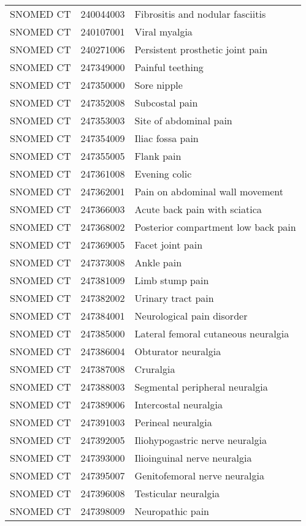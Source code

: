 \begin{longtable}{p{}p{}p{}}
  SNOMED CT & 240044003 & Fibrositis and nodular fasciitis \\ 
  SNOMED CT & 240107001 & Viral myalgia \\ 
  SNOMED CT & 240271006 & Persistent prosthetic joint pain \\ 
  SNOMED CT & 247349000 & Painful teething \\ 
  SNOMED CT & 247350000 & Sore nipple \\ 
  SNOMED CT & 247352008 & Subcostal pain \\ 
  SNOMED CT & 247353003 & Site of abdominal pain \\ 
  SNOMED CT & 247354009 & Iliac fossa pain \\ 
  SNOMED CT & 247355005 & Flank pain \\ 
  SNOMED CT & 247361008 & Evening colic \\ 
  SNOMED CT & 247362001 & Pain on abdominal wall movement \\ 
  SNOMED CT & 247366003 & Acute back pain with sciatica \\ 
  SNOMED CT & 247368002 & Posterior compartment low back pain \\ 
  SNOMED CT & 247369005 & Facet joint pain \\ 
  SNOMED CT & 247373008 & Ankle pain \\ 
  SNOMED CT & 247381009 & Limb stump pain \\ 
  SNOMED CT & 247382002 & Urinary tract pain \\ 
  SNOMED CT & 247384001 & Neurological pain disorder \\ 
  SNOMED CT & 247385000 & Lateral femoral cutaneous neuralgia \\ 
  SNOMED CT & 247386004 & Obturator neuralgia \\ 
  SNOMED CT & 247387008 & Cruralgia \\ 
  SNOMED CT & 247388003 & Segmental peripheral neuralgia \\ 
  SNOMED CT & 247389006 & Intercostal neuralgia \\ 
  SNOMED CT & 247391003 & Perineal neuralgia \\ 
  SNOMED CT & 247392005 & Iliohypogastric nerve neuralgia \\ 
  SNOMED CT & 247393000 & Ilioinguinal nerve neuralgia \\ 
  SNOMED CT & 247395007 & Genitofemoral nerve neuralgia \\ 
  SNOMED CT & 247396008 & Testicular neuralgia \\ 
  SNOMED CT & 247398009 & Neuropathic pain \\ 

\end{longtable}
